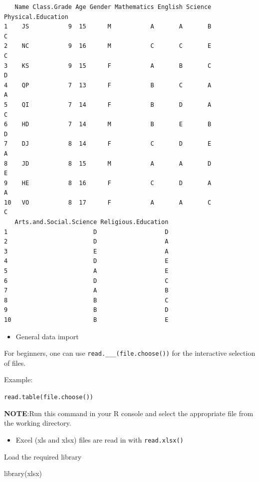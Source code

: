 \documentclass[
  letterpaper,
  DIV=11,
  numbers=noendperiod]{scrreprt}
\newenvironment{Shaded}{\begin{snugshade}}{\end{snugshade}}
\newcommand{\FunctionTok}[1]{\textcolor[rgb]{0.28,0.35,0.67}{#1}}
\newcommand{\NormalTok}[1]{\textcolor[rgb]{0.00,0.23,0.31}{#1}}
\providecommand{\tightlist}{%
  \setlength{\itemsep}{0pt}\setlength{\parskip}{0pt}}\usepackage{longtable,booktabs,array}
\begin{document}
\begin{verbatim}
   Name Class.Grade Age Gender Mathematics English Science Physical.Education
1    JS           9  15      M           A       A       B                  C
2    NC           9  16      M           C       C       E                  C
3    KS           9  15      F           A       B       C                  D
4    QP           7  13      F           B       C       A                  A
5    QI           7  14      F           B       D       A                  C
6    HD           7  14      M           B       E       B                  D
7    DJ           8  14      F           C       D       E                  A
8    JD           8  15      M           A       A       D                  E
9    HE           8  16      F           C       D       A                  A
10   VO           8  17      F           A       A       C                  C
   Arts.and.Social.Science Religious.Education
1                        D                   D
2                        D                   A
3                        E                   A
4                        D                   E
5                        A                   E
6                        D                   C
7                        A                   B
8                        B                   C
9                        B                   D
10                       B                   E
\end{verbatim}

\begin{itemize}
\tightlist
\item
  General data import
\end{itemize}

For beginners, one can use \texttt{read.\_\_\_(file.choose())} for the
interactive selection of files.

Example:

\texttt{read.table(file.choose())}

\textbf{NOTE}:Run this command in your R console and select the
appropriate file from the working directory.

\begin{itemize}
\tightlist
\item
  Excel (xls and xlsx) files are read in with \texttt{read.xlsx()}
\end{itemize}

Load the required library

\begin{Shaded}
\begin{Highlighting}[]
\FunctionTok{library}\NormalTok{(xlsx)}
\end{Highlighting}
\end{Shaded}
\end{document}
